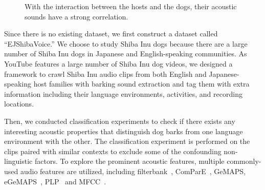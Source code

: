\begin{figure}[t]
	\centering
	\caption{With the interaction between the hosts and the dogs, their acoustic sounds have a strong correlation.}%
	\label{fig:intropic}
\end{figure}

Since there is no existing dataset, we first construct a dataset called ``EJShibaVoice.'' We choose to study Shiba Inu dogs because there are a large number of Shiba Inu dogs in Japanese and English-speaking communities. 
As YouTube features a large number of Shiba Inu dog videos, we designed a framework to crawl Shiba Inu audio clips from both English and Japanese-speaking host families with barking sound extraction and tag them with extra information including their language environments, activities, and recording locations. %

Then, we conducted classification experiments to check if there exists any interesting acoustic properties 
that distinguish dog barks from one language environment with the other. 
The classification experiment is performed on the clips paired with similar contexts to exclude some of the confounding non-linguistic factors. 
To explore the prominent acoustic features, 
multiple commonly-used audio features are utilized, including filterbank~\cite{strang1996wavelets}, 
ComParE~\cite{schuller2013interspeech}, GeMAPS, eGeMAPS~\cite{eyben2015geneva}, 
PLP~\cite{eyben2015geneva} and MFCC~\cite{davis1980comparison}.


